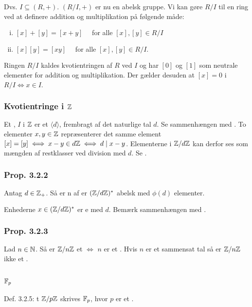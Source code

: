 Dvs. $I \subseteq (R, +)$. $(R/I, +)$ er nu en abelsk gruppe. Vi kan gøre $R/I$
til en ring ved at definere addition og multiplikation på følgende måde:
\begin{enumerate}[(i)]
  \item $[x] + [y] = [x + y] \quad$ for alle $[x],[y] \in R/I$
  \item $[x][y] = [xy] \quad$ for alle $[x],[y] \in R/I$.
\end{enumerate}

Ringen $R/I$ kaldes kvotientringen af $R$ ved $I$ og har $[0]$ og $[1]$ som
neutrale elementer for addition og multiplikation. Der gælder desuden at $[x] =
0$ i $R/I \iff x \in I$.

\subsubsection{Kvotientringe i $\mathbb{Z}$}
\label{Kvotientringe i Z}
Et , $I$ i $\mathbb{Z}$ er et  $\langle d \rangle$,
frembragt af det naturlige tal $d$. Se sammenhængen med . To
elementer $x, y \in \mathbb{Z}$ repræsenterer det samme element $[x] = [y] \iff x - y
\in d\mathbb{Z} \iff d \mid x - y$. Elementerne i $\mathbb{Z}/d\mathbb{Z}$ kan derfor ses som mængden
af restklasser ved division med $d$. Se .

\subsubsection{Prop. 3.2.2}
\label{Prop. 3.2.2}
Antag $d \in \mathbb{Z}_+$. Så er n af er $(\mathbb{Z}/d\mathbb{Z})^*$
abelsk med $\phi(d)$ elementer.

Enhederne $x \in (\mathbb{Z}/d\mathbb{Z})^*$ er e med $d$. Bemærk
sammenhængen med . 

\subsubsection{Prop. 3.2.3}
\label{Prop. 3.2.3}
Lad $n \in \mathbb{N}$. Så er $\mathbb{Z}/n\mathbb{Z}$ et  $\iff$ $n$ er
et . Hvis $n$ er et sammensat tal så er $\mathbb{Z}/n\mathbb{Z}$ ikke et
.

\subsubsection{$\mathbb{F}_p$}
\label{F_p}
Def. 3.2.5: t $\mathbb{Z}/p\mathbb{Z}$ skrives $\mathbb{F}_p$, hvor $p$ er et
.

